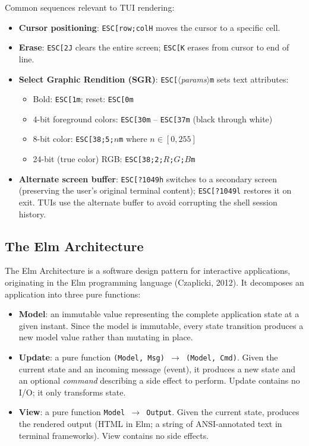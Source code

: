 Common sequences relevant to TUI rendering:
\begin{itemize}
    \item \textbf{Cursor positioning}: \texttt{ESC[row;colH} moves the cursor to a specific cell.
    \item \textbf{Erase}: \texttt{ESC[2J} clears the entire screen; \texttt{ESC[K} erases from cursor to end of line.
    \item \textbf{Select Graphic Rendition (SGR)}: \texttt{ESC[}$\langle$\textit{params}$\rangle$\texttt{m} sets text attributes:
    \begin{itemize}
        \item Bold: \texttt{ESC[1m}; reset: \texttt{ESC[0m}
        \item 4-bit foreground colors: \texttt{ESC[30m} – \texttt{ESC[37m} (black through white)
        \item 8-bit color: \texttt{ESC[38;5;}$n$\texttt{m} where $n \in [0, 255]$
        \item 24-bit (true color) RGB: \texttt{ESC[38;2;}$R$\texttt{;}$G$\texttt{;}$B$\texttt{m}
    \end{itemize}
    \item \textbf{Alternate screen buffer}: \texttt{ESC[?1049h} switches to a secondary screen (preserving the user's original terminal content); \texttt{ESC[?1049l} restores it on exit. TUIs use the alternate buffer to avoid corrupting the shell session history.
\end{itemize}

\subsection{The Elm Architecture}

The Elm Architecture is a software design pattern for interactive applications, originating in the Elm programming language (Czaplicki, 2012). It decomposes an application into three pure functions:

\begin{itemize}
    \item \textbf{Model}: an immutable value representing the complete application state at a given instant. Since the model is immutable, every state transition produces a new model value rather than mutating in place.
    \item \textbf{Update}: a pure function \texttt{(Model, Msg) $\to$ (Model, Cmd)}. Given the current state and an incoming message (event), it produces a new state and an optional \emph{command} describing a side effect to perform. Update contains no I/O; it only transforms state.
    \item \textbf{View}: a pure function \texttt{Model $\to$ Output}. Given the current state, produces the rendered output (HTML in Elm; a string of ANSI-annotated text in terminal frameworks). View contains no side effects.
\end{itemize}

